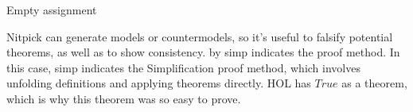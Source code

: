 \begin{isabellebody}
{  Empty assignment \color{black}%
}%
\endisatagproof
{\isafoldproof}%
%
\isadelimproof
%
\endisadelimproof
%
\begin{isamarkuptext}%
Nitpick \cite{nitpick} can generate models or countermodels, so it's useful to falsify potential
theorems, as well as to show consistency. {\color{red} by simp} indicates the proof method. In this 
case, {\color{red} simp} indicates the Simplification proof method, which involves unfolding definitions
and applying theorems directly. HOL has $True$ as a theorem, which is why this theorem was so easy to prove.%
\end{isamarkuptext}\isamarkuptrue%
%
\isadelimtheory
%
\endisadelimtheory
%
\isatagtheory
%
\endisatagtheory
{\isafoldtheory}%
%
\isadelimtheory
%
\endisadelimtheory
%
\end{isabellebody}%
\endinput

